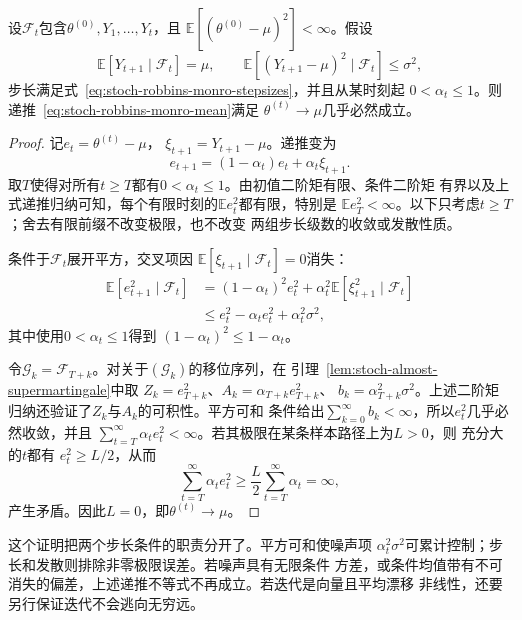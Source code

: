 \begin{theorem}[均值求根的几乎必然收敛]
  \label{thm:stoch-mean-root-convergence}
  设$\mathcal{F}_t$包含$\theta^{(0)},Y_1,\ldots,Y_t$，且
  $\mathbb{E}[(\theta^{(0)}-\mu)^2]<\infty$。假设
  \[
    \mathbb{E}[Y_{t+1}\mid\mathcal{F}_t]=\mu,\qquad
    \mathbb{E}[(Y_{t+1}-\mu)^2\mid\mathcal{F}_t]\leq\sigma^2,
  \]
  步长满足式~\eqref{eq:stoch-robbins-monro-stepsizes}，并且从某时刻起
  $0<\alpha_t\leq1$。则递推~\eqref{eq:stoch-robbins-monro-mean}满足
  $\theta^{(t)}\to\mu$几乎必然成立。
\end{theorem}

\begin{proof}
记$e_t=\theta^{(t)}-\mu$，
$\xi_{t+1}=Y_{t+1}-\mu$。递推变为
\[
  e_{t+1}
  =
  (1-\alpha_t)e_t+\alpha_t\xi_{t+1}.
  \]
取$T$使得对所有$t\geq T$都有$0<\alpha_t\leq1$。由初值二阶矩有限、条件二阶矩
有界以及上式递推归纳可知，每个有限时刻的$\mathbb{E}e_t^2$都有限，特别是
$\mathbb{E}e_T^2<\infty$。以下只考虑$t\geq T$；舍去有限前缀不改变极限，也不改变
两组步长级数的收敛或发散性质。

条件于$\mathcal{F}_t$展开平方，交叉项因
$\mathbb{E}[\xi_{t+1}\mid\mathcal{F}_t]=0$消失：
\begin{align*}
  \mathbb{E}[e_{t+1}^2\mid\mathcal{F}_t]
  &=
  (1-\alpha_t)^2e_t^2
  +
  \alpha_t^2
  \mathbb{E}[\xi_{t+1}^2\mid\mathcal{F}_t]\\
  &\leq
  e_t^2-\alpha_t e_t^2+\alpha_t^2\sigma^2,
\end{align*}
其中使用$0<\alpha_t\leq1$得到
$(1-\alpha_t)^2\leq1-\alpha_t$。

令$\mathcal{G}_k=\mathcal{F}_{T+k}$。对关于$(\mathcal{G}_k)$的移位序列，在
引理~\ref{lem:stoch-almost-supermartingale}中取
$Z_k=e_{T+k}^2$、$A_k=\alpha_{T+k}e_{T+k}^2$、
$b_k=\alpha_{T+k}^2\sigma^2$。上述二阶矩归纳还验证了$Z_k$与$A_k$的可积性。平方可和
条件给出$\sum_{k=0}^{\infty}b_k<\infty$，所以$e_t^2$几乎必然收敛，并且
$\sum_{t=T}^{\infty}\alpha_te_t^2<\infty$。若其极限在某条样本路径上为$L>0$，则
充分大的$t$都有
$e_t^2\geq L/2$，从而
\[
  \sum_{t=T}^{\infty}\alpha_te_t^2
  \geq
  \frac{L}{2}\sum_{t=T}^{\infty}\alpha_t
  =
  \infty,
  \]
产生矛盾。因此$L=0$，即$\theta^{(t)}\to\mu$。
\end{proof}

这个证明把两个步长条件的职责分开了。平方可和使噪声项
$\alpha_t^2\sigma^2$可累计控制；步长和发散则排除非零极限误差。若噪声具有无限条件
方差，或条件均值带有不可消失的偏差，上述递推不等式不再成立。若迭代是向量且平均漂移
非线性，还要另行保证迭代不会逃向无穷远。

